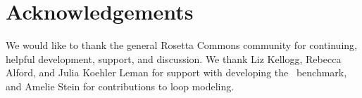 \section{Acknowledgements}
We would like to thank the general Rosetta Commons community for continuing, helpful development, support, and discussion. We thank Liz Kellogg, Rebecca Alford, and Julia Koehler Leman for support with developing the \ddg\ benchmark, and Amelie Stein for contributions to loop modeling.